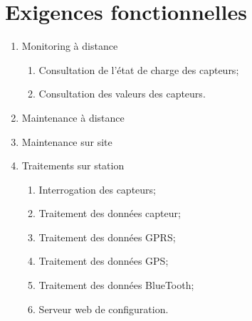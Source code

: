 
\section{Exigences fonctionnelles}

    \begin{enumerate}

    \renewcommand{\labelenumi}
            {FO n\degres \arabic{enumi}~:}
    \renewcommand{\labelenumii}
            {FO n\degres \arabic{enumi}.\arabic{enumii}~:}
    
        \item Monitoring à distance
            \begin{enumerate}
                \item Consultation de l'état de charge des capteurs;
                \item Consultation des valeurs des capteurs.
            \end{enumerate}

        \item Maintenance à distance
        
        \item Maintenance sur site

        \item Traitements sur station
            \begin{enumerate}
                \item Interrogation des capteurs;
                \item Traitement des données capteur;
                \item Traitement des données GPRS;
                \item Traitement des données GPS;
                \item Traitement des données BlueTooth;
                \item Serveur web de configuration.
            \end{enumerate}
    \end{enumerate}
